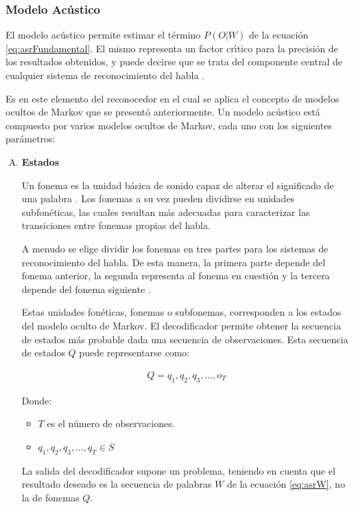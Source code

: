 \subsubsection{Modelo Ac\'ustico}
El modelo ac\'ustico permite estimar el t\'ermino $P(O|W)$ de la ecuaci\'on \ref{eq:asrFundamental}.
El mismo representa un factor cr{\'\i}tico para la precisi\'on de los resultados obtenidos, y puede decirse que
se trata del componente central de cualquier sistema de reconocimiento del habla \cite{huang-handbook10}.

Es en este elemento del reconocedor en el cual se aplica el concepto de modelos ocultos de Markov que se present\'o
anteriormente. Un modelo ac\'ustico est\'a compuesto por varios modelos ocultos de Markov, cada uno con
los siguientes par\'ametros:


\begin{enumerate}[A)]
	\item \textbf{Estados}


	Un fonema es la unidad b\'asica de sonido capaz de alterar el significado de una palabra \cite{Armbruster2003}.
	Los fonemas a su vez pueden dividirse en unidades subfon\'eticas, las cuales resultan m\'as adecuadas para
	caracterizar las transiciones entre fonemas propias del habla.

	A menudo se elige dividir los fonemas en tres partes para los sistemas de reconocimiento del habla.
	De esta manera, la primera parte depende del fonema anterior, la segunda representa al fonema en cuesti\'on
	y la tercera depende del fonema siguiente \cite{CMUConcepts}.

	Estas unidades fon\'eticas, fonemas o subfonemas, corresponden a los estados del modelo oculto de Markov.
	El decodificador permite obtener la secuencia de estados m\'as probable dada una secuencia de observaciones.
	Esta secuencia de estados $Q$ puede representarse como:

	\begin{align}
		Q = q_1,q_2,q_3,\ldots,o_T\label{eq:hmmQ}
	\end{align}

	Donde:
	\begin{itemize}
		\item $T$ es el n\'umero de observaciones.
		\item $q_1,q_2,q_3,\ldots,q_T \in S$
	\end{itemize}

	La salida del decodificador supone un problema, teniendo en cuenta que el resultado deseado es la secuencia 
	de palabras $W$ de la ecuaci\'on \ref{eq:asrW}, no la de fonemas $Q$.


\end{enumerate}
